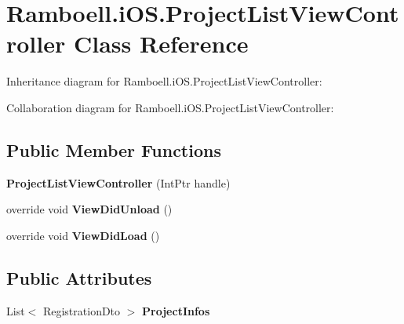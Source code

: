 \hypertarget{class_ramboell_1_1i_o_s_1_1_project_list_view_controller}{}\section{Ramboell.\+i\+O\+S.\+Project\+List\+View\+Controller Class Reference}
\label{class_ramboell_1_1i_o_s_1_1_project_list_view_controller}


Inheritance diagram for Ramboell.\+i\+O\+S.\+Project\+List\+View\+Controller\+:


Collaboration diagram for Ramboell.\+i\+O\+S.\+Project\+List\+View\+Controller\+:
\subsection*{Public Member Functions}
\begin{DoxyCompactItemize}
\item 
\mbox{\label{class_ramboell_1_1i_o_s_1_1_project_list_view_controller_af11dbb2ef75ff0c212db5eb3e83221f1}} 
{\bfseries Project\+List\+View\+Controller} (Int\+Ptr handle)
\item 
\mbox{\label{class_ramboell_1_1i_o_s_1_1_project_list_view_controller_a5c7c55c88d9791e012eee872c4932b1a}} 
override void {\bfseries View\+Did\+Unload} ()
\item 
\mbox{\label{class_ramboell_1_1i_o_s_1_1_project_list_view_controller_a10bb2d9313173756397337ac4f4a0da1}} 
override void {\bfseries View\+Did\+Load} ()
\end{DoxyCompactItemize}
\subsection*{Public Attributes}
\begin{DoxyCompactItemize}
\item 
\mbox{\label{class_ramboell_1_1i_o_s_1_1_project_list_view_controller_abb2511c3c29ee55bb6562e30893fc917}} 
List$<$ Registration\+Dto $>$ {\bfseries Project\+Infos}
\end{DoxyCompactItemize}
